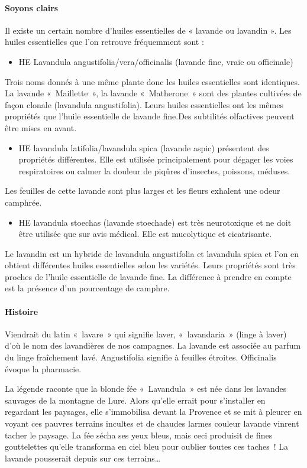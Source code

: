 \documentclass[12pt,a4wide]{article}
\begin{document}
\paragraph{Soyons clairs}
\label{sec-4-8-2-3}
Il existe un certain nombre d'huiles essentielles de « lavande ou lavandin ». Les huiles essentielles que l'on retrouve fréquemment sont :
\begin{itemize}
\item HE Lavandula angustifolia/vera/officinalis (lavande fine, vraie ou officinale)
\end{itemize}
Trois noms donnés à une même plante donc les huiles essentielles sont identiques. La lavande « Maillette », la lavande « Matherone » sont des plantes cultivées de façon clonale (lavandula angustifolia). Leurs huiles essentielles ont les mêmes propriétés que l'huile essentielle de lavande fine.Des subtilités olfactives peuvent être mises en avant.
\begin{itemize}
\item HE lavandula latifolia/lavandula spica (lavande aspic) présentent des propriétés différentes. Elle est utilisée principalement pour dégager les voies respiratoires ou calmer la douleur de piqûres d'insectes, poissons, méduses.
\end{itemize}
Les feuilles de cette lavande sont plus larges et les fleurs exhalent une odeur camphrée.
\begin{itemize}
\item HE lavandula stoechas (lavande stoechade) est très neurotoxique et ne doit être utilisée que sur avis médical. Elle est mucolytique et cicatrisante.
\end{itemize}
Le lavandin est un hybride de lavandula angustifolia et lavandula spica et l'on en obtient différentes huiles essentielles selon les variétés. Leurs propriétés sont très proches de l'huile essentielle de lavande fine. La différence à prendre en compte est la présence d'un pourcentage de camphre.



\paragraph{Histoire}
\label{sec-4-8-2-4}
Viendrait du latin « lavare » qui signifie laver, « lavandaria » (linge à laver) d'où le nom des lavandières de nos campagnes. La lavande est associée au parfum du linge fraîchement lavé. Angustifolia signifie à feuilles étroites. Officinalis évoque la pharmacie.

La légende raconte que la blonde fée « Lavandula » est née dans les lavandes sauvages de la montagne de Lure. Alors qu'elle errait pour s'installer en regardant les paysages, elle s'immobilisa devant la Provence et se mit à pleurer en voyant ces pauvres terrains incultes et de chaudes larmes couleur lavande vinrent tacher le paysage. La fée sécha ses yeux bleus, mais ceci produisit de fines gouttelettes qu'elle transforma en ciel bleu pour oublier toutes ces taches ! La lavande pousserait depuis sur ces terrains…
\end{document}
